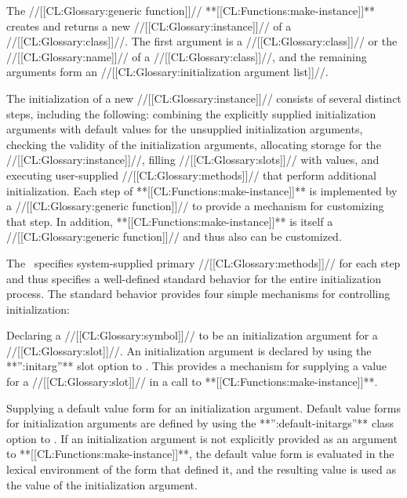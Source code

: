 

                       The //[[CL:Glossary:generic function]]// **[[CL:Functions:make-instance]]** creates and returns a new //[[CL:Glossary:instance]]// of a //[[CL:Glossary:class]]//.  The first argument is a //[[CL:Glossary:class]]// or the //[[CL:Glossary:name]]// of a //[[CL:Glossary:class]]//, and the remaining arguments form an  //[[CL:Glossary:initialization argument list]]//.

The initialization of a new //[[CL:Glossary:instance]]// consists of several distinct steps, including the following: combining the explicitly supplied initialization arguments with default values for the unsupplied initialization arguments,  checking the validity of the initialization arguments, allocating storage  for the //[[CL:Glossary:instance]]//, filling //[[CL:Glossary:slots]]// with values, and executing user-supplied //[[CL:Glossary:methods]]// that perform additional initialization.  Each step of **[[CL:Functions:make-instance]]** is implemented by a //[[CL:Glossary:generic function]]// to provide a mechanism for customizing that step.   In addition, **[[CL:Functions:make-instance]]** is itself a //[[CL:Glossary:generic function]]//  and thus also can be customized.

The \OS\ specifies system-supplied primary //[[CL:Glossary:methods]]// for each step  and thus specifies a well-defined standard behavior for the entire initialization process.  The standard behavior provides four simple mechanisms for controlling initialization:

\beginlist

\itemitem{\bull} Declaring a //[[CL:Glossary:symbol]]// to be an initialization argument  for a //[[CL:Glossary:slot]]//.  An initialization argument is declared by using the **'':initarg''** slot option to .  This provides a mechanism for supplying a value for a //[[CL:Glossary:slot]]// in a call to **[[CL:Functions:make-instance]]**.

\itemitem{\bull} Supplying a default value form for an initialization argument. Default value forms for initialization arguments are defined by using the **'':default-initargs''** class option to .  If an  initialization argument is not explicitly provided as an argument to **[[CL:Functions:make-instance]]**, the default value form is evaluated in the lexical environment of the  form that defined it, and the resulting value is used as the value of the initialization argument.

